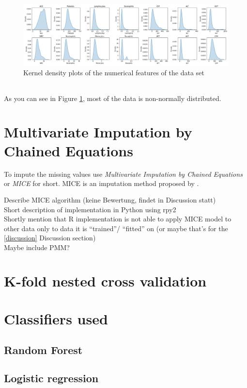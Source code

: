 \begin{figure}[ht]
    \centering
    \includegraphics[width=1.1\textwidth]{figures/density_no_split.jpg}
    \caption{Kernel density plots of the numerical features of the data set}
    \label{fig:density}
\end{figure}
\\
As you can see in Figure \ref{fig:density}, most of the data is non-normally 
distributed.

\section{Multivariate Imputation by Chained Equations}
To impute the missing values \citeauthor{RN127} use \textit{Multivariate 
Imputation by Chained Equations} or \textit{MICE} for short. MICE is an 
imputation method proposed by \citeauthor{RN135} \cite{RN135}.
\begin{changemargin}{50pt}{50pt}
Describe MICE algorithm (keine Bewertung, findet in Discussion statt)
\\
Short description of implementation in Python using rpy2
\\
Shortly mention that R implementation is not able to apply MICE model to other 
data only to data it is ``trained''/ ``fitted'' on (or maybe that's for the 
\ref{discussion} Discussion section)
\\
Maybe include PMM?
\end{changemargin}
\section{K-fold nested cross validation}
\section{Classifiers used}
\subsection{Random Forest}
\subsection{Logistic regression}
